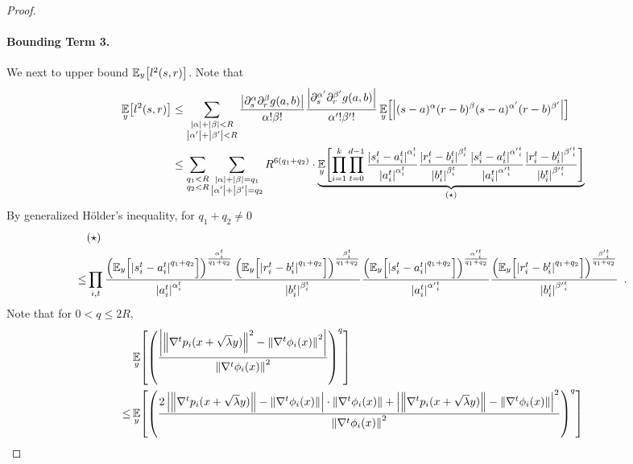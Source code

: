 \documentclass[12pt]{article}
\newcommand{\grad}[2]{\nabla^{#1}{#2}}
\newcommand{\br}[1]{\left(#1\right)} \newcommand{\Br}[1]{\left[#1\right]} \newcommand{\st}[1]{\left\{#1\right\}} \newcommand{\tr}[1]{\mathrm{Tr}\!\Br{#1}} \newcommand{\abs}[1]{\left|#1 \right|} \newcommand{\norm}[1]{\left\lVert #1 \right\rVert} \newcommand{\agl}[2]{\theta^{\br{#1}}_{#2}} \newcommand{\aglp}[2]{{\theta'}^{\br{#1}}_{#2}} \newcommand{\lint}[1]{\left\lfloor#1\right\rfloor} \newcommand{\poly}[1]{\mathrm{poly}\!\br{#1}} \newcommand{\negl}[1]{\mathrm{negl}\!\br{#1}} \newcommand{\de}[1]{\mathrm{d}#1} \newcommand{\val}[1]{\mathrm{val}\!\br{#1}} \newcommand{\vall}[1]{\mathrm{val}\br{#1}} \newcommand{\nd}[1]{\mathcal{N}\!\br{#1}} \newcommand{\ketbratwo}[2]{\ket{#1} \hspace{-0.4em}\bra{#2}} \newcommand{\ketbra}[1]{\ketbratwo{#1}{#1}} \newcommand{\id}{\ensuremath{\mathds{1}}} \newcommand{\ogroup}[1]{\mathrm{O}\!\br{#1}} \newcommand{\ugroup}[1]{\mathrm{U}\!\br{#1}} \newcommand{\td}{\mathrm{TD}} \newcommand{\tv}[1]{\norm{#1}_{\mathrm{TV}}} \newcommand {\defeq} {\ensuremath{ \stackrel{\mathrm{def}}{=} }} \newcommand{\vdim}{\ensuremath{N}} \newcommand{\dimin}{\ensuremath{n}} \newcommand{\dimout}{\ensuremath{m}} \newcommand{\ncopy}{\ell} \newcommand{\hspacein}{\H_\mathrm{in}} \newcommand{\hspaceout}{\H_\mathrm{out}} \newcommand{\Sin}{\S(\hspacein)} \newcommand{\Sout}{\S(\hspaceout)} \newcommand{\haar}{\ensuremath{\mu}} \newcommand{\tensorhaar}{\ensuremath{\eta}} \newcommand{\tensorsrss}{\ensuremath{\nu}} \newcommand{\qadvice}{\ensuremath{\rho}} \newcommand{\tp}{\otimes} \newcommand{\wone}[2]{W_1\!\br{#1,#2}}
\begin{document}
\begin{proof}
	\paragraph{Bounding Term 3.}
	We next to upper bound $\expect{y}{l^2(s,r)}$. Note that
	\begin{align*}
		\expect{y}{l^2(s,r)}
		&\leq \sum_{\substack{ \abs{\alpha} +\abs{\beta} <R
					\\ \abs{\alpha'} +\abs{\beta'} <R }}
		\frac{\abs{\partial^\alpha_s\partial^\beta_r g(a,b)}}{\alpha!\beta!}\frac{\abs{\partial^{\alpha'}_s\partial^{\beta'}_r g(a,b)}}{\alpha'!\beta'!}
			\expect{y}{\abs{(s-a)^\alpha(r-b)^\beta(s-a)^{\alpha'}(r-b)^{\beta'}}} \\
			\
		&\leq
		\sum_{\substack{q_1<R\\q_2<R}}
		\sum_{\substack{ \abs{\alpha} +\abs{\beta} =q_1
					\\ \abs{\alpha'} +\abs{\beta'} =q_2 }}
					R^{6(q_1+q_2)}\cdot
		\underbrace{
			\expect{y}{ \prod_{i=1}^{k} \prod_{t=0}^{d-1}
			\frac{\abs{s_i^t-a_i^t}^{\alpha_i^t}}{\abs{a^{t}_i}^{\alpha_i^t}}
			\frac{\abs{r_i^t-b_i^t}^{\beta_i^t}}{\abs{b^{t}_i}^{\beta_i^t}} 
			\frac{\abs{s_i^t-a_i^t}^{{\alpha'}_i^t}}{\abs{a^{t}_i}^{{\alpha'}_i^t}}
			\frac{\abs{r_i^t-b_i^t}^{{\beta'}_i^t}}{\abs{b^{t}_i}^{{\beta'}_i^t}} } }_
			{(\star)}
	\end{align*}
	By generalized H\"older's inequality, for $q_1+q_2\neq 0$
	\begin{align*}
		&(\star) \\
		\leq &\prod_{i,t}
			\frac{\br{\expect{y}{\abs{s_i^t-a_i^t}^{q_1+q_2}}}^{\frac{\alpha_i^t}{q_1+q_2}}}{\abs{a^{t}_i}^{\alpha_i^t}}
			\frac{\br{\expect{y}{\abs{r_i^t-b_i^t}^{q_1+q_2}}}^{\frac{\beta_i^t}{q_1+q_2}}}{\abs{b^{t}_i}^{\beta_i^t}} 
			\frac{\br{\expect{y}{\abs{s_i^t-a_i^t}^{q_1+q_2}}}^{\frac{{\alpha'}_i^t}{q_1+q_2}}}{\abs{a^{t}_i}^{{\alpha'}_i^t}}
			\frac{\br{\expect{y}{\abs{r_i^t-b_i^t}^{q_1+q_2}}}^{\frac{{\beta'}_i^t}{q_1+q_2}}}{\abs{b^{t}_i}^{{\beta'}_i^t}}\enspace  .
	\end{align*}
	Note that for $0<q\leq 2R$,
	\begin{align*}
		&\expect{y}{\br{\frac{\abs{\norm{\grad{t}{p_i(x+\sqrt{\lambda}y)}}^2 - \norm{\grad{t}{\phi_i(x)}}^2}}{\norm{\grad{t}{\phi_i(x)}}^2}}^q}\\
		\leq &\expect{y}{\br{
		\frac{
		2\abs{\norm{\grad{t}{p_i(x+\sqrt{\lambda}y)}} -  \norm{\grad{t}{\phi_i(x)}}}\cdot \norm{\grad{t}{\phi_i(x)}} + \abs{\norm{\grad{t}{p_i(x+\sqrt{\lambda}y)}} -  \norm{\grad{t}{\phi_i(x)}}}^2
		}
		{\norm{\grad{t}{\phi_i(x)}}^2}}^q}\\

\end{align*}
\end{proof}
\end{document}
